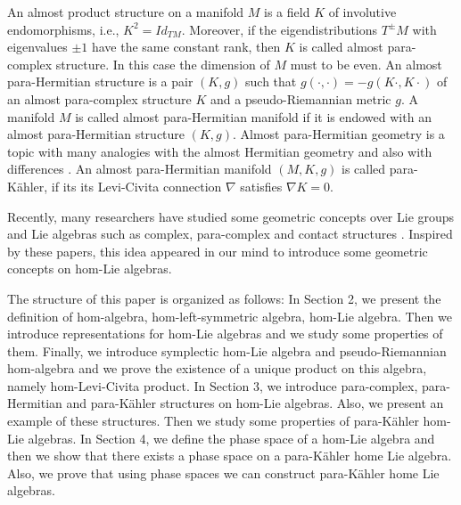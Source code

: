 \documentclass[10pt]{amsart}
\numberwithin{equation}{section}
\begin{document}
An almost product structure on a manifold $M$ is a field $K$ of involutive
endomorphisms, i.e., $K^2=Id_{TM}$. Moreover, if the eigendistributions $T^{\pm}M$ with eigenvalues $\pm 1$ have the same constant rank, then $K$ is called almost para-complex structure. In this case the dimension of $M$ must to be even. An almost para-Hermitian structure is a pair $(K,g)$ such that $g(\cdot, \cdot)=-g(K\cdot, K\cdot)$ of an almost para-complex structure $K$ and a pseudo-Riemannian metric $g$. A manifold $M$ is called almost para-Hermitian manifold if
it is endowed with an almost para-Hermitian structure $(K,g)$. Almost para-Hermitian geometry is a topic with many analogies with the almost Hermitian geometry and also with differences \cite{IZ}. An almost para-Hermitian manifold $(M, K, g)$ is called para-K\"{a}hler, if its its Levi-Civita connection $\nabla$ satisfies $\nabla K=0$.

Recently, many researchers have studied some geometric concepts over Lie groups and Lie algebras such as complex, para-complex  and contact structures \cite{A, ABD, ABD1, CF, DV}. Inspired by these papers, this idea appeared in our mind to introduce some geometric concepts on hom-Lie algebras. 

The structure of this paper is organized as follows: In Section 2, we present the definition of hom-algebra, hom-left-symmetric algebra, hom-Lie algebra. Then we introduce representations for hom-Lie algebras and we study some properties of them. Finally, we introduce symplectic hom-Lie algebra and pseudo-Riemannian hom-algebra and we prove the existence of a unique product on this algebra, namely hom-Levi-Civita product. In Section 3, we introduce para-complex, para-Hermitian and para-K\"{a}hler structures on hom-Lie algebras. Also, we present an example of these structures. Then we study some properties of para-K\"{a}hler hom-Lie algebras. In Section 4, we define the phase space of a hom-Lie algebra and then we show that there exists a phase space on a para-K\"{a}hler home Lie algebra. Also, we prove that using phase spaces we can construct para-K\"{a}hler home Lie algebras.
\end{document}
